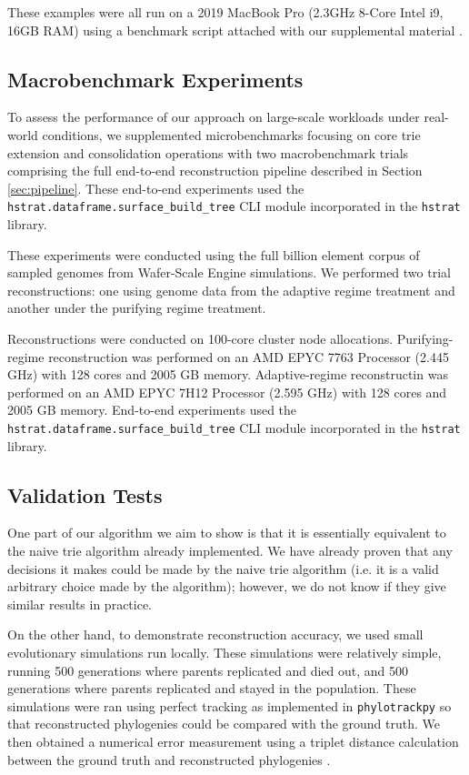 These examples were all run on a 2019 MacBook Pro (2.3GHz 8-Core Intel i9, 16GB RAM) using a benchmark script attached with our supplemental material \citep{supplemental}.

\subsection{Macrobenchmark Experiments}

To assess the performance of our approach on large-scale workloads under real-world conditions, we supplemented microbenchmarks focusing on core trie extension and consolidation operations with two macrobenchmark trials comprising the full end-to-end reconstruction pipeline described in Section \ref{sec:pipeline}.
These end-to-end experiments used the \texttt{hstrat.dataframe.surface\_build\_tree} CLI module incorporated in the \texttt{hstrat} library.

These experiments were conducted using the full billion element corpus of sampled genomes from Wafer-Scale Engine simulations.
We performed two trial reconstructions: one using genome data from the adaptive regime treatment and another under the purifying regime treatment.

Reconstructions were conducted on 100-core cluster node allocations.
Purifying-regime reconstruction was performed on an AMD EPYC 7763 Processor (2.445 GHz) with 128 cores and 2005 GB memory.
Adaptive-regime reconstructin was performed on an AMD EPYC 7H12 Processor (2.595 GHz) with 128 cores and 2005 GB memory.
End-to-end experiments used the \texttt{hstrat.dataframe.surface\_build\_tree} CLI module incorporated in the \texttt{hstrat} library.

\subsection{Validation Tests}

One part of our algorithm we aim to show is that it is essentially equivalent to the naive trie algorithm already implemented.
We have already proven that any decisions it makes could be made by the naive trie algorithm (i.e. it is a valid arbitrary choice made by the algorithm); however, we do not know if they give similar results in practice.

On the other hand, to demonstrate reconstruction accuracy, we used small evolutionary simulations run locally. 
These simulations were relatively simple, running 500 generations where parents replicated and died out, and 500 generations where parents replicated and stayed in the population. These simulations were ran using perfect tracking as implemented in \texttt{phylotrackpy} \citep{dolson2024phylotrack} so that reconstructed phylogenies could be compared with the ground truth.
We then obtained a numerical error measurement using a triplet distance calculation between the ground truth and reconstructed phylogenies \citep{critchlow1996triples}.

